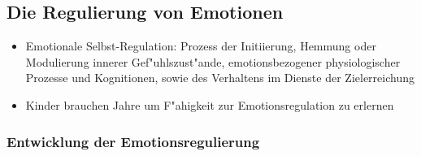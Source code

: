 \subsection{Die Regulierung von Emotionen}
\begin{itemize}
	\item
		Emotionale Selbst-Regulation: Prozess der Initiierung, Hemmung oder Modulierung innerer Gef"uhlszust"ande, emotionsbezogener physiologischer Prozesse und Kognitionen, sowie des Verhaltens im Dienste der Zielerreichung
	\item
		Kinder brauchen Jahre um F"ahigkeit zur Emotionsregulation zu erlernen

\end{itemize}


\subsubsection{Entwicklung der Emotionsregulierung}
